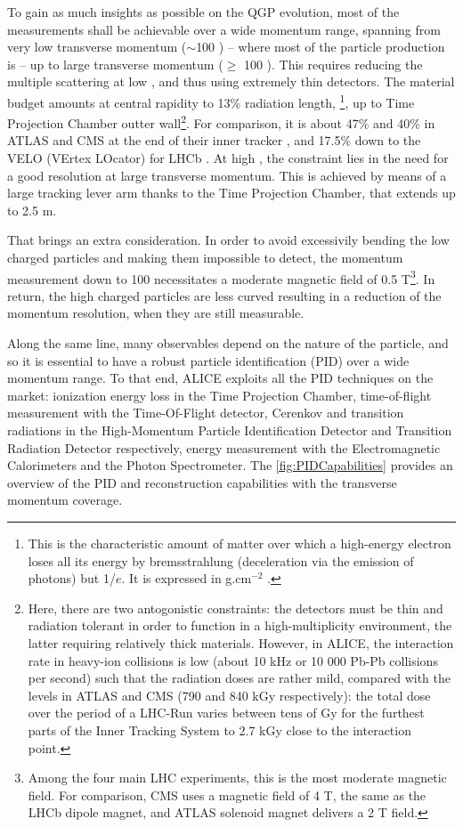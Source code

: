 To gain as much insights as possible on the QGP evolution, most of the measurements shall be achievable over a wide momentum range, spanning from very low transverse momentum ($\sim$100 \mmom) -- where most of the particle production is -- up to large transverse momentum ($\geq$ 100 \gmom). This requires reducing the multiple scattering at low \pT, and thus using extremely thin detectors. The material budget amounts at central rapidity to 13\% radiation length, \Xzero\footnote{This is the characteristic amount of matter over which a high-energy electron loses all its energy by bremsstrahlung (\ie deceleration via the emission of photons) but 1/$e$. It is expressed in g.cm$^{-2}$ \cite{particledatagroupReviewParticlePhysics2022}.}, up to Time Projection Chamber outter wall\footnote{Here, there are two antogonistic constraints: the detectors must be thin and radiation tolerant in order to function in a high-multiplicity environment, the latter requiring relatively thick materials. However, in ALICE, the interaction rate in heavy-ion collisions is low (about 10 kHz or 10 000 Pb-Pb collisions per second) such that the radiation doses are rather mild, compared with the levels in ATLAS and CMS (790 and 840 kGy respectively): the total dose over the period of a LHC-Run varies between tens of Gy for the furthest parts of the Inner Tracking System to 2.7 kGy close to the interaction point.}. For comparison, it is about 47\% and 40\% \Xzero in ATLAS and CMS at the end of their inner tracker \cite{aadATLASExperimentCERN2008}\cite{cmscollaborationCMSExperimentCERN2008}, and 17.5\% \Xzero down to the VELO (VErtex LOcator) for LHCb \cite{lhcbcollaborationLHCbDetectorLHC2008}. At high \pT, the constraint lies in the need for a good resolution at large transverse momentum. This is achieved by means of a large tracking lever arm thanks to the Time Projection Chamber, that extends up to 2.5 m. 

That brings an extra consideration. In order to avoid excessivily bending the low \pT charged particles and making them impossible to detect, the momentum measurement down to 100 \mmom necessitates a moderate magnetic field of 0.5 T\footnote{Among the four main LHC experiments, this is the most moderate magnetic field. For comparison, CMS uses a magnetic field of 4 T, the same as the LHCb dipole magnet, and ATLAS solenoid magnet delivers a 2 T field.}. In return, the high \pT charged particles are less curved resulting in a reduction of the momentum resolution, when they are still measurable. 

Along the same line, many observables depend on the nature of the particle, and so it is essential to have a robust particle identification (PID) over a wide momentum range. To that end, ALICE exploits all the PID techniques on the market: ionization energy loss in the Time Projection Chamber, time-of-flight measurement with the Time-Of-Flight detector, Cerenkov and transition radiations in the High-Momentum Particle Identification Detector and Transition Radiation Detector respectively, energy measurement with the Electromagnetic Calorimeters and the Photon Spectrometer. The \fig\ref{fig:PIDCapabilities} provides an overview of the PID and reconstruction capabilities with the transverse momentum coverage.\\



